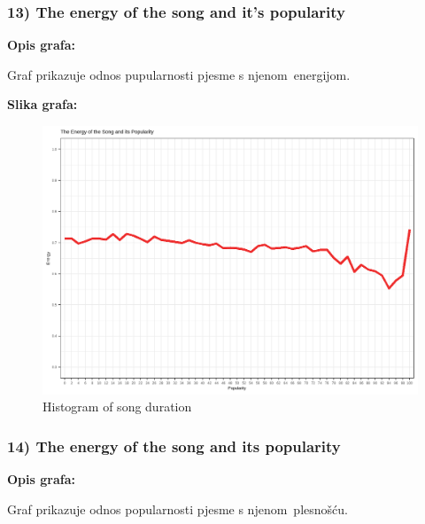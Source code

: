     \subsubsection{13) The energy of the song and it's popularity}
    
    \textbf{Opis grafa:}
    
    Graf prikazuje odnos pupularnosti pjesme s njenom energijom.
    
    
    \textbf{Slika grafa:}
    \begin{figure}[H]
    	\includegraphics[scale=0.9]{slike/energy_popularity.png}
    	\centering
    	\caption{Histogram of song duration}
    	
    \end{figure}
    
    \subsubsection{14) The energy of the song and its popularity}
    
    \textbf{Opis grafa:}
    
    Graf prikazuje odnos popularnosti pjesme s njenom plesnošću.
    
